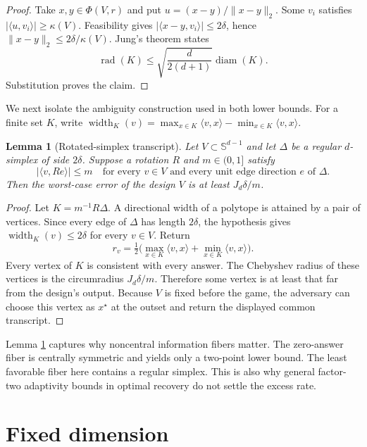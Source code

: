 \documentclass{article}
\newcommand{\Sph}{\mathbb{S}}
\newcommand{\ip}[2]{\langle #1,#2\rangle}
\newcommand{\rad}{\operatorname{rad}}
\newcommand{\diam}{\operatorname{diam}}
\newcommand{\width}{\operatorname{width}}
\newtheorem{lemma}[theorem]{Lemma}
\theoremstyle{definition}
\begin{document}
\begin{proof}
Take $x,y\in\Phi(V,r)$ and put $u=(x-y)/\|x-y\|_2$.  Some $v_i$ satisfies $|\ip{u}{v_i}|\geq\kappa(V)$.  Feasibility gives $|\ip{x-y}{v_i}|\leq2\delta$, hence $\|x-y\|_2\leq2\delta/\kappa(V)$.  Jung's theorem \citep{jung1901kleinste,gruber2007convex} states \[ \rad(K)\leq\sqrt{\frac{d}{2(d+1)}}\diam(K). \] Substitution proves the claim.
\end{proof}

We next isolate the ambiguity construction used in both lower bounds.  For a finite set $K$, write $\width_K(v)=\max_{x\in K}\ip{v}{x}-\min_{x\in K}\ip{v}{x}$.

\begin{lemma}[Rotated-simplex transcript]                           \label{lem:simplex}
Let $V\subset\Sph^{d-1}$ and let $\Delta$ be a regular $d$-simplex of side $2\delta$.  Suppose a rotation $R$ and $m\in(0,1]$ satisfy \[ |\ip{v}{Re}|\leq m \quad\text{for every }v\in V \text{ and every unit edge direction }e\text{ of }\Delta. \] Then the worst-case error of the design $V$ is at least $J_d\delta/m$.
\end{lemma}

\begin{proof}
Let $K=m^{-1}R\Delta$.  A directional width of a polytope is attained by a pair of vertices.  Since every edge of $\Delta$ has length $2\delta$, the hypothesis gives $\width_K(v)\leq2\delta$ for every $v\in V$.  Return \[ r_v=\tfrac12\big(\max_{x\in K}\ip{v}{x} +\min_{x\in K}\ip{v}{x}\big). \] Every vertex of $K$ is consistent with every answer.  The Chebyshev radius of these vertices is the circumradius $J_d\delta/m$.  Therefore some vertex is at least that far from the design's output.  Because $V$ is fixed before the game, the adversary can choose this vertex as $x^\star$ at the outset and return the displayed common transcript.
\end{proof}

Lemma \ref{lem:simplex} captures why noncentral information fibers matter. The zero-answer fiber is centrally symmetric and yields only a two-point lower bound.  The least favorable fiber here contains a regular simplex.  This is also why general factor-two adaptivity bounds in optimal recovery do not settle the excess rate.

\section{Fixed dimension}                                          \label{sec:fixed}
\end{document}
